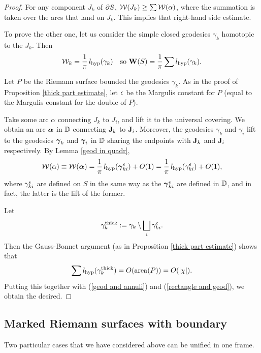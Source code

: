 \begin{proof}
    For any component $J_k$ of $\partial  S $, ${\mathcal W}(J_k)\geq \sum
    {\mathcal W}(\alpha)$, where the summation is taken over the arcs that land
    on $J_k$. This implies that right-hand side estimate. 

 To prove the other one, let us consider the simple closed geodesics
 $\gamma_k$ homotopic to the $J_k$. Then 
\begin{equation}\label{geod and annuli} 
        \WW_k =  \frac 1\pi\,   l_\hyp(\gamma_k) \quad \mathrm{so}\ 
\BW  (S) = \frac 1\pi \sum l_\hyp(\gamma_k). 
\end{equation}

Let $P$ be the Riemann surface bounded the geodesics $\gamma_k$. 
As in the proof of Proposition \ref{thick part estimate}, let ${\epsilon}$ be the Margulis
constant for $P$ (equal to the Margulis constant for the double of $P$).

Take some arc $\alpha$ connecting $J_k$ to $J_i$, and lift it to the
universal covering. We obtain an arc ${\mbox{\boldmath$\alpha$} }$ in ${\Bbb D}$ connecting ${\mathbf{J}}_k$
to ${\mathbf{J}}_i$. Moreover, the geodesics $\gamma_k$ and $\gamma_i$ lift to
the geodesics ${\boldsymbol{\gamma}}_k$ and ${\boldsymbol{\gamma}}_i$ in ${\Bbb D}$ sharing the endpoints with ${\mathbf{J}}_k$ and ${\mathbf{J}}_i$
respectively. By Lemma \ref{geod in quadr}, 
\begin{equation}\label{rectangle  and geod}   
   {\mathcal W}(\alpha) \equiv {\mathcal W}({\mbox{\boldmath$\alpha$} }) =\frac 1\pi\, l_{\mathrm{hyp}} ({\boldsymbol{\gamma}}_{ki} ^{\epsilon})
   + O(1)= \frac 1\pi \, l_{\mathrm{hyp}} (\gamma_{ki} ^{\epsilon}) +O(1),
\end{equation}
where $\gamma_{ki}^{\epsilon}$ are defined on $S$ in the same way as the
${\boldsymbol{\gamma}}_{ki}^{\epsilon}$ are defined in ${\Bbb D}$, and in fact, the latter is the
lift of the former.  

Let 
$$
   \gamma_k^{ \mathrm{thick}}: =  \gamma_k \setminus \bigsqcup_i \gamma_{ki}^{\epsilon}. 
$$
Then the Gauss-Bonnet  argument (as in Proposition \ref{thick part estimate}) shows that 
$$
    \sum l_{\mathrm{hyp}} ( \gamma_k^{ \mathrm{thick}} ) = O(\operatorname{area} (P) ) = O(|\chi | ).
$$
Putting this together with (\ref{geod and annuli}) and (\ref{rectangle  and geod}), we obtain the
desired. 
\end{proof}


\subsection{Marked Riemann surfaces with boundary}

Two particular cases that we have considered above can be unified in
one frame. 

